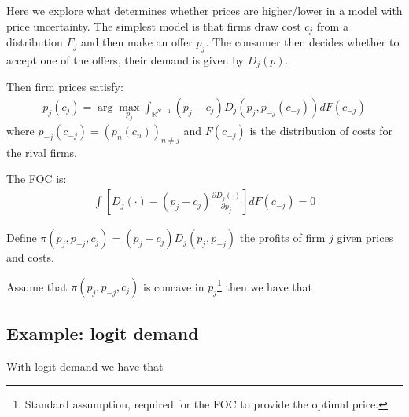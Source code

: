 \documentclass[12pt]{article}
\begin{document}
Here we explore what determines whether prices are higher/lower in a model with price uncertainty. The simplest model is that firms draw cost $c_j$ from a distribution $F_j$ and then make an offer $p_j$. The consumer then decides whether to accept one of the offers, their demand is given by $D_j(p)$. 

Then firm prices satisfy: 
\begin{align} \label{eq:base_equilibrium} %
    p_j(c_j) = \arg \max_{p_j} \int_{\mathbb{R}^{N-1}}^{} (p_j - c_j) D_j(p_j, p_{-j}(c_{-j})) dF(c_{-j})
\end{align} 
where $p_{-j}(c_{-j}) = (p_n(c_n))_{n \neq j}$ and $F(c_{-j} )$ is the distribution of costs for the rival firms. 


The FOC is: 
\begin{align} %
    \int \left[ D_j(\cdot) - (p_j - c_j) \frac{\partial D_j(\cdot)}{\partial p_j } \right] dF(c_{-j}) = 0  
\end{align}


Define $ \pi(p_j, p_{-j}, c_j) = (p_j - c_j) D_j(p_j, p_{-j})$ the profits of firm $j$ given prices and costs. 

Assume that $\pi(p_j, p_{-j}, c_j)$ is concave in $p_j$\footnote{Standard assumption, required for the FOC to provide the optimal price.}
then we have that 



\subsection{Example: logit demand}
With logit demand we have that

\vspace{3cm}
\end{document}
